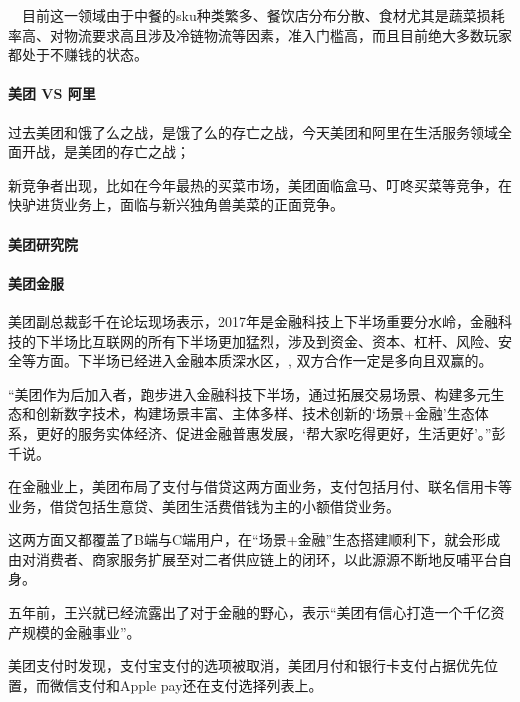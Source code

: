 \documentclass[letterpaper,10pt,english]{sphinxmanual}
\begin{document}
　目前这一领域由于中餐的sku种类繁多、餐饮店分布分散、食材尤其是蔬菜损耗率高、对物流要求高且涉及冷链物流等因素，准入门槛高，而且目前绝大多数玩家都处于不赚钱的状态。


\paragraph{美团 VS 阿里}
\label{\detokenize{chapter_AI_company/meituan:id10}}
过去美团和饿了么之战，是饿了么的存亡之战，今天美团和阿里在生活服务领域全面开战，是美团的存亡之战；

新竞争者出现，比如在今年最热的买菜市场，美团面临盒马、叮咚买菜等竞争，在快驴进货业务上，面临与新兴独角兽美菜的正面竞争。


\paragraph{美团研究院}
\label{\detokenize{chapter_AI_company/meituan:id11}}


\paragraph{美团金服}
\label{\detokenize{chapter_AI_company/meituan:id12}}
美团副总裁彭千在论坛现场表示，2017年是金融科技上下半场重要分水岭，金融科技的下半场比互联网的所有下半场更加猛烈，涉及到资金、资本、杠杆、风险、安全等方面。下半场已经进入金融本质深水区，,
双方合作一定是多向且双赢的。

“美团作为后加入者，跑步进入金融科技下半场，通过拓展交易场景、构建多元生态和创新数字技术，构建场景丰富、主体多样、技术创新的‘场景+金融’生态体系，更好的服务实体经济、促进金融普惠发展，‘帮大家吃得更好，生活更好’。”彭千说。

在金融业上，美团布局了支付与借贷这两方面业务，支付包括月付、联名信用卡等业务，借贷包括生意贷、美团生活费\sphinxhyphen{}借钱为主的小额借贷业务。

这两方面又都覆盖了B端与C端用户，在“场景+金融”生态搭建顺利下，就会形成由对消费者、商家服务扩展至对二者供应链上的闭环，以此源源不断地反哺平台自身。

五年前，王兴就已经流露出了对于金融的野心，表示“美团有信心打造一个千亿资产规模的金融事业”。

美团支付时发现，支付宝支付的选项被取消，美团月付和银行卡支付占据优先位置，而微信支付和Apple
pay还在支付选择列表上。%
\begin{footnote}[1037]\sphinxAtStartFootnote
{}
%
\end{footnote}
\end{document}
